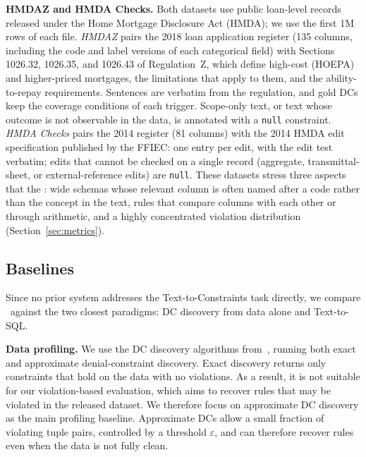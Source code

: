 \smallskip\noindent\textbf{HMDAZ and HMDA Checks.}
Both datasets use public loan-level records released under the Home Mortgage
Disclosure Act (HMDA); we use the
first 1M rows of each file. \emph{HMDAZ} pairs the 2018 loan application
register (135 columns, including the code and label versions of each
categorical field) with Sections 1026.32, 1026.35, and 1026.43 of Regulation~Z,
which define high-cost (HOEPA) and higher-priced mortgages, the limitations
that apply to them, and the ability-to-repay requirements. Sentences are verbatim from
the regulation, and gold DCs keep the coverage conditions of each trigger.
Scope-only text, or text whose outcome is not observable in the data, is
annotated with a \texttt{null} constraint. \emph{HMDA Checks} pairs the 2014
register (81 columns) with the 2014 HMDA edit specification published by the
FFIEC: one entry per edit, with the edit test verbatim; edits that cannot be
checked on a single record (aggregate, transmittal-sheet, or external-reference
edits) are \texttt{null}. These datasets stress three aspects that the : wide schemas whose relevant column is often named after a code
rather than the concept in the text, rules that compare columns with each other
or through arithmetic, and a
highly concentrated violation distribution (Section~\ref{sec:metrics}).

\subsection{Baselines}
\label{sec:baselines}

Since no prior system addresses the Text-to-Constraints task directly, we compare \system\ against the two closest paradigms: DC discovery from data alone and Text-to-SQL.


\smallskip\noindent\textbf{Data profiling.}
We use the DC discovery algorithms from~\cite{Pena2022FastDC}, running both exact and approximate denial-constraint discovery. Exact discovery returns only constraints that hold on the data with no violations. As a result, it is not suitable for our violation-based evaluation, which aims to recover rules that may be violated in the released dataset. We therefore focus on approximate DC discovery as the main profiling baseline. Approximate DCs allow a small fraction of violating tuple pairs, controlled by a threshold $\varepsilon$, and can therefore recover rules even when the data is not fully clean. 

